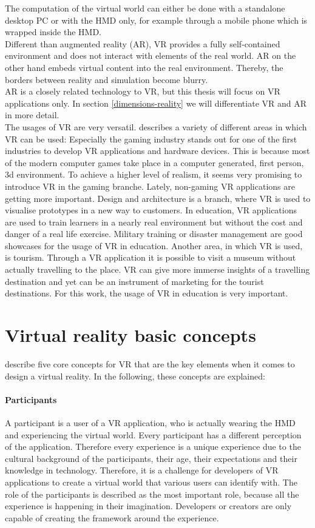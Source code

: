 The computation of the virtual world can either be done with a standalone desktop PC or with the HMD only, for example through a mobile phone which is wrapped inside the HMD.\\
Different than augmented reality (AR), VR provides a fully self-contained environment and does not interact with elements of the real world. AR on the other hand embeds virtual content into the real environment. Thereby, the borders between reality and simulation become blurry. \cite{Dorner.2013} \\AR is a closely related technology to VR, but this thesis will focus on VR applications only. In section \ref{dimensions-reality} we will differentiate VR and AR in more detail.\\
The usages of VR are very versatil. \cite{Linowes.2015} describes a variety of different areas in which VR can be used: Especially the gaming industry stands out for one of the first industries to develop VR applications and hardware devices. This is because most of the modern computer games take place in a computer generated, first person, 3d environment. To achieve a higher level of realism, it seems very promising to introduce VR in the gaming branche. Lately, non-gaming VR applications are getting more important. Design and architecture is a branch, where VR is used to visualise prototypes in a new way to customers. In education, VR applications are used to train learners in a nearly real environment but without the cost and danger of a real life exercise. Military training or disaster management are good showcases for the usage of VR in education. Another area, in which VR is used, is tourism. Through a VR application it is possible to visit a museum without actually travelling to the place. VR can give more immerse insights of a travelling destination and yet can be an instrument of marketing for the tourist destinations. For this work, the usage of VR in education  is very important.
\section{Virtual reality basic concepts}
\label{basic-concepts}
\cite{Sherman.2019} describe five core concepts for VR that are the key elements when it comes to design a virtual reality. In the following, these concepts are explained:
\paragraph{Participants} A participant is a user of a VR application, who is actually wearing the HMD and experiencing the virtual world. Every participant has a different perception of the application. Therefore every experience is a unique experience due to the cultural background of the participants, their age, their expectations and their knowledge in technology. Therefore, it is a challenge for developers of VR applications to create a virtual world that various users can identify with. The role of the participants is described as the most important role, because all the experience is happening in their imagination. Developers or creators are only capable of creating the framework around the experience.
